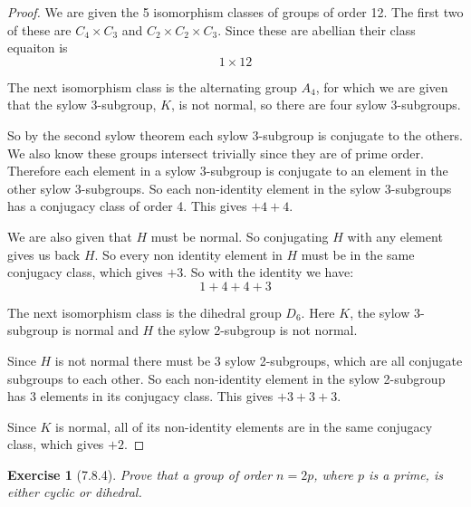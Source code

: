 \documentclass[12pt]{article}
\newtheorem*{exer}{Exercise}
\begin{document}
\begin{proof}

    We are given the 5 isomorphism classes of groups of order 12. The
    first two of these are $C_4 \times C_3$ and $C_2
    \times C_2 \times C_3$. Since these are abellian their class
    equaiton is 
    \[
        1 \times 12
    \]

    The next isomorphism class is the alternating group $A_4$, for which
    we are given that the sylow 3-subgroup, $K$, is not normal, so there
    are four sylow 3-subgroups.

    So by the second sylow theorem each sylow 3-subgroup is conjugate to
    the others. We also know these groups intersect trivially since they
    are of prime order. Therefore each element in a sylow 3-subgroup is
    conjugate to an element in the other sylow 3-subgroups. So each
    non-identity element in the sylow 3-subgroups has a conjugacy class
    of order 4. This gives $ + 4 + 4$.

    We are also given that $H$ must be normal. So conjugating $H$ with
    any element gives us back $H$. So every non identity element in $H$ must be in the
    same conjugacy class, which gives $+ 3$. So with the identity we
    have:
    \[
        1 + 4 + 4 + 3
    \]

    The next isomorphism class is the dihedral group $D_6$. Here $K$,
    the sylow 3-subgroup is normal and $H$ the sylow 2-subgroup is not
    normal. 

    Since $H$ is not normal there must be 3 sylow 2-subgroups, which are
    all conjugate subgroups to each other. So each non-identity element
    in the sylow 2-subgroup has 3 elements in its conjugacy class. This
    gives $+ 3 + 3 + 3$.

    Since $K$ is normal, all of its non-identity elements are in the
    same conjugacy class, which gives $+2$.


    

\end{proof}


\begin{exer}[7.8.4]

    Prove that a group of order $n = 2p$, where $p$ is a prime, is
    either cyclic or dihedral.

\end{exer}
\end{document}
